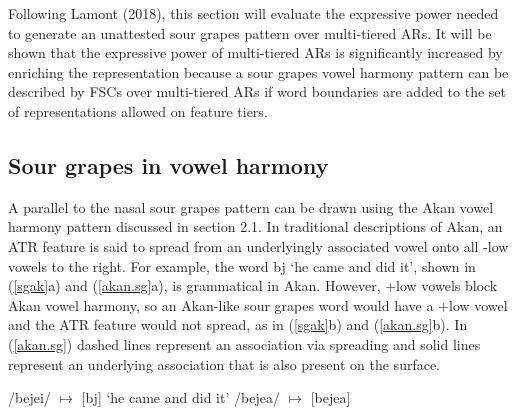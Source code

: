 \documentclass[,doc,floatsintext]{apa6}
\theoremstyle{definition}
\theoremstyle{definition}
\theoremstyle{definition}
\theoremstyle{remark}
\begin{document}
Following Lamont (2018), this section will evaluate the expressive power
needed to generate an unattested sour grapes pattern over multi-tiered
ARs. It will be shown that the expressive power of multi-tiered ARs is
significantly increased by enriching the representation because a sour
grapes vowel harmony pattern can be described by FSCs over multi-tiered
ARs if word boundaries are added to the set of representations allowed
on feature tiers.

\subsection{Sour grapes in vowel
harmony}\label{sour-grapes-in-vowel-harmony}

A parallel to the nasal sour grapes pattern can be drawn using the Akan
vowel harmony pattern discussed in section 2.1. In traditional
descriptions of Akan, an ATR feature is said to spread from an
underlyingly associated vowel onto all -low vowels to the right. For
example, the word bj `he
came and did it', shown in (\ref{sgak}a) and (\ref{akan.sg}a), is
grammatical in Akan. However, +low vowels block Akan vowel harmony, so
an Akan-like sour grapes word would have a +low vowel and the ATR
feature would not spread, as in (\ref{sgak}b) and (\ref{akan.sg}b). In
(\ref{akan.sg}) dashed lines represent an association via spreading and
solid lines represent an underlying association that is also present on
the surface.

\begin{exe}
\label{sgak} 
\begin{xlist}
  \ex /bejei/ $\mapsto$ [bj] `he came and did it'
  \ex /bejea/ $\mapsto$ [bejea]
\end{xlist}
\end{exe}
\end{document}
